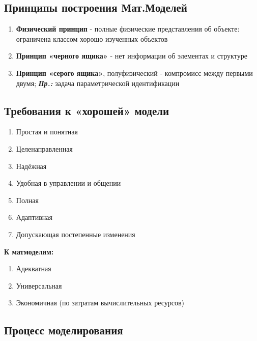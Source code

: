 	\subsection{Принципы построения Мат.Моделей}
	\begin{enumerate}
		\item \textbf{Физический принцип} - полные физические представления об объекте: ограничена классом хорошо изученных объектов
		\item \textbf{Принцип «черного ящика»} - нет информации об элементах и структуре
		\item \textbf{Принцип «серого ящика»}, полуфизический - компромисс между первыми двумя; \newline \textbf{\textit{Пр.:}} задача параметрической идентификации
	\end{enumerate}
	
	\subsection{Требования к «хорошей» модели}
	
	\begin{enumerate}
		\item Простая и понятная
		\item Целенаправленная
		\item Надёжная
		\item Удобная в управлении и общении
		\item Полная
		\item Адаптивная
		\item Допускающая постепенные изменения
	\end{enumerate}

	\begin{pinkbox}
		\textbf{К матмоделям:}
	\end{pinkbox}

	\begin{enumerate}
		\item Адекватная
		\item Универсальная
		\item Экономичная (по затратам вычислительных ресурсов)
	\end{enumerate}
	
	\subsection{Процесс моделирования}
	
